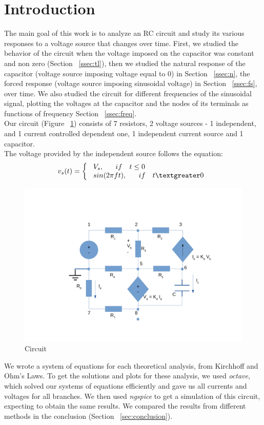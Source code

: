 \section{Introduction}
\label{sec:intro}
The main goal of this work is to analyze an RC circuit and study its various responses to a voltage source that changes over time. First, we studied the behavior of the circuit when the voltage imposed on the capacitor was constant and non zero (Section ~\ref{ssec:tl}), then we studied the natural response of the capacitor (voltage source imposing voltage equal to 0) in Section ~\ref{ssec:n}, the forced response (voltage source imposing sinusoidal voltage) in Section ~\ref{ssec:fs}, over time. We also studied the circuit for different frequencies of the sinusoidal signal, plotting the voltages at the capacitor and the nodes of its terminals as functions of frequency Section ~\ref{ssec:freq}.\\

Our circuit (Figure ~\ref{fig:circuit}) consists of 7 resistors, 2 voltage sources - 1 independent, and 1 current controlled dependent one, 1 independent current source and 1 capacitor.\\
The voltage provided by the independent source follows the equation:
\begin{equation}\label{eqn:vss}
\begin{split}
{v_s (t)} = \left\{\begin{array}{ll} \ V_s ,  \quad \ \  if \ \  \ t \leq 0 \\ 
 \ sin(2 \pi f t) , \quad \ \  if \ \ \ t \textgreater 0 \end{array} \right.
  \end{split}
\end{equation}
\begin{figure}[H] \centering
\includegraphics[width=0.8\linewidth]{circuito.pdf}
\caption{Circuit}
\label{fig:circuit}
\end{figure} 
We wrote a system of equations for each theoretical analysis, from Kirchhoff and Ohm's Laws. To get the solutions and plots for these analysis, we used \textit{octave}, which solved our systems of equations efficiently and gave us all currents and voltages for all branches. We then used \textit{ngspice} to get a simulation of this circuit, expecting to obtain the same results. We compared the results from different methods in the conclusion (Section ~\ref{sec:conclusion}).

